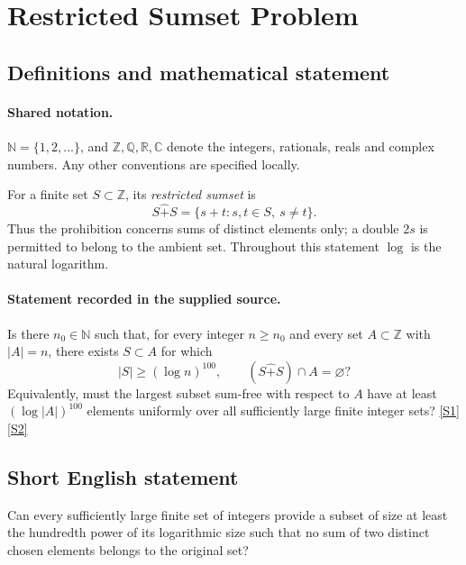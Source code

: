 \documentclass[11pt]{article}
\newcommand{\sref}[2]{\hyperlink{source:#1:#2}{[S#2]}}
\begin{document}
\section{Restricted Sumset Problem}\label{statement}

\subsection{Definitions and mathematical statement}

\paragraph{Shared notation.}$\mathbb N=\{1,2,\ldots\}$, and $\mathbb Z,\mathbb Q,\mathbb R,\mathbb C$ denote the integers, rationals, reals and complex numbers. Any other conventions are specified locally.


For a finite set $S\subset\mathbb Z$, its \emph{restricted sumset} is
\[
S\widehat{+}S=\{s+t:s,t\in S,\ s\ne t\}.
\]
Thus the prohibition concerns sums of distinct elements only; a double $2s$ is permitted to belong to the ambient set. Throughout this statement $\log$ is the natural logarithm.
\paragraph{Statement recorded in the supplied source.}
Is there $n_0\in\mathbb N$ such that, for every integer $n\ge n_0$ and every set $A\subset\mathbb Z$ with $|A|=n$, there exists $S\subset A$ for which
\[
|S|\ge(\log n)^{100},\qquad (S\widehat{+}S)\cap A=\varnothing?
\]
Equivalently, must the largest subset sum-free with respect to $A$ have at least $(\log |A|)^{100}$ elements uniformly over all sufficiently large finite integer sets? \sref{statement}{1}\sref{statement}{2}
\subsection{Short English statement}
Can every sufficiently large finite set of integers provide a subset of size at least the hundredth power of its logarithmic size such that no sum of two distinct chosen elements belongs to the original set?
\end{document}
